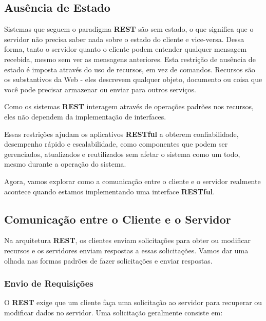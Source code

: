 \documentclass[12pt, a4paper
]{article}
\begin{document}
\hypertarget{ausuxeancia-de-estado}{%
\subsection{Ausência de Estado}\label{ausuxeancia-de-estado}}

Sistemas que seguem o paradigma \textbf{REST} são sem estado, o que
significa que o servidor não precisa saber nada sobre o estado do
cliente e vice-versa. Dessa forma, tanto o servidor quanto o cliente
podem entender qualquer mensagem recebida, mesmo sem ver as mensagens
anteriores. Esta restrição de ausência de estado é imposta através do
uso de recursos, em vez de comandos. Recursos são os substantivos da Web
- eles descrevem qualquer objeto, documento ou coisa que você pode
precisar armazenar ou enviar para outros serviços.

Como os sistemas \textbf{REST} interagem através de operações padrões
nos recursos, eles não dependem da implementação de interfaces.

Essas restrições ajudam os aplicativos \textbf{RESTful} a obterem
confiabilidade, desempenho rápido e escalabilidade, como componentes que
podem ser gerenciados, atualizados e reutilizados sem afetar o sistema
como um todo, mesmo durante a operação do sistema.

Agora, vamos explorar como a comunicação entre o cliente e o servidor
realmente acontece quando estamos implementando uma interface
\textbf{RESTful}.

\hypertarget{comunicauxe7uxe3o-entre-o-cliente-e-o-servidor}{%
\subsection{Comunicação entre o Cliente e o Servidor}\label{comunicauxe7uxe3o-entre-o-cliente-e-o-servidor}}

Na arquitetura \textbf{REST}, os clientes enviam solicitações para obter
ou modificar recursos e os servidores enviam respostas a essas
solicitações. Vamos dar uma olhada nas formas padrões de fazer
solicitações e enviar respostas.

\hypertarget{envio-de-requisiuxe7uxf5es}{%
\subsubsection{Envio de Requisições}\label{envio-de-requisiuxe7uxf5es}}

O \textbf{REST} exige que um cliente faça uma solicitação ao servidor
para recuperar ou modificar dados no servidor. Uma solicitação
geralmente consiste em:
\end{document}
